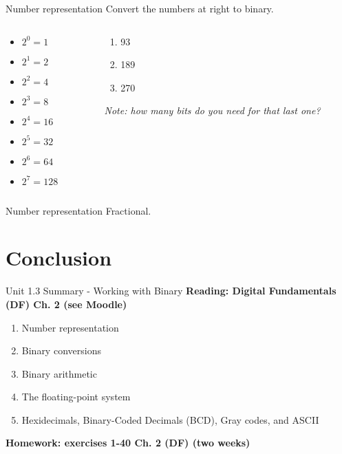 \documentclass{beamer}
\begin{document}
\begin{frame}{Number representation}
Convert the numbers at right to binary. \\ \vspace{1cm}
\begin{columns}[T]
\begin{column}{0.5\textwidth}
\begin{itemize}
\item $2^0 = 1$
\item $2^1 = 2$
\item $2^2 = 4$
\item $2^3 = 8$
\item $2^4 = 16$
\item $2^5 = 32$
\item $2^6 = 64$
\item $2^7 = 128$
\end{itemize}
\end{column}
\begin{column}{0.5\textwidth}
\begin{enumerate}
\item 93
\item 189
\item 270
\end{enumerate}
\textit{Note: how many bits do you need for that last one?}
\end{column}
\end{columns}
\end{frame}

\begin{frame}{Number representation}
Fractional.
\end{frame}

\section{Conclusion}

\begin{frame}{Unit 1.3 Summary - Working with Binary}
\textbf{Reading: Digital Fundamentals (DF) Ch. 2 (see Moodle)}
\begin{enumerate}
\item Number representation
\item Binary conversions
\item Binary arithmetic
\item The floating-point system
\item Hexidecimals, Binary-Coded Decimals (BCD), Gray codes, and ASCII
\end{enumerate}
\textbf{Homework: exercises 1-40 Ch. 2 (DF) (two weeks)}
\end{frame}
\end{document}
